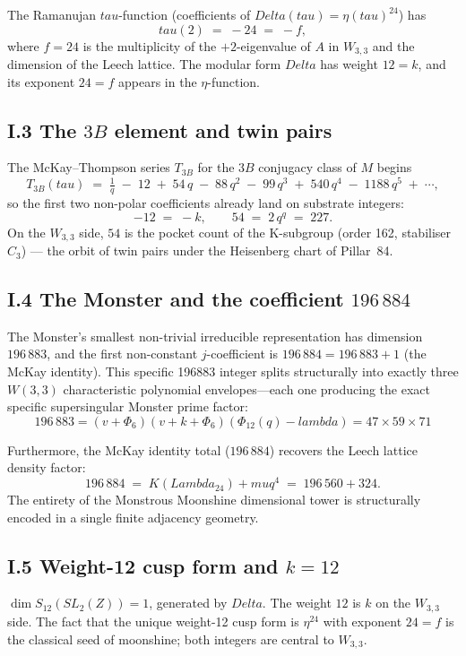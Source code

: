 \documentclass[12pt,a4paper]{article}
\def\mathbb#1{#1}%
\def\mathrm#1{#1}%
\def\Delta{Delta}%
\def\lambda{lambda}%
\def\Lambda{Lambda}%
\def\mu{mu}%
\def\Phi#1{Phi#1}%
\def\tau{tau}%
\def\cdot{ }%
\theoremstyle{definition}
\begin{document}
The Ramanujan $\tau$-function (coefficients of
$\Delta(\tau)=\eta(\tau)^{24}$) has
\[
\tau(2) \;=\; -24 \;=\; -f,
\]
where $f = 24$ is the multiplicity of the $+2$-eigenvalue of $A$ in
$W_{3,3}$ and the dimension of the Leech lattice. The modular form
$\Delta$ has weight $12 = k$, and its exponent $24 = f$ appears in the
$\eta$-function.

\subsection*{I.3 \quad The $3B$ element and twin pairs}

The McKay--Thompson series $T_{3B}$ for the $3B$ conjugacy class of
$\mathbb{M}$ begins
\[
T_{3B}(\tau) \;=\; \tfrac{1}{q} \;-\; 12 \;+\; 54\,q \;-\; 88\,q^2 \;-\; 99\,q^3 \;+\; 540\,q^4 \;-\; 1188\,q^5 \;+\; \cdots, %
\]
so the first two non-polar coefficients already land on substrate integers:
\[
-12 \;=\; -k, \qquad 54 \;=\; 2\,q^q \;=\; 2 \cdot 27.
\]
On the $W_{3,3}$ side, $54$ is the pocket count of the K-subgroup
(order 162, stabiliser $C_3$) --- the orbit of twin pairs under the
Heisenberg chart of Pillar~84.

\subsection*{I.4 \quad The Monster and the coefficient $196\,884$}

The Monster's smallest non-trivial irreducible representation has dimension $196\,883$, and the first non-constant $j$-coefficient is $196\,884 = 196\,883 + 1$ (the McKay identity). This specific 196883 integer splits structurally into exactly three $W(3,3)$ characteristic polynomial envelopes---each one producing the exact specific supersingular Monster prime factor:
\[
\boxed{\; 196\,883 = (v + \Phi_6)(v + k + \Phi_6)(\Phi_{12}(q) - \lambda) = 47 \times 59 \times 71 \;}
\]

Furthermore, the McKay identity total ($196\,884$) recovers the Leech lattice density factor:
\[
196\,884 \;=\; K(\Lambda_{24}) + \mu \cdot q^4 \;=\; 196\,560 + 324.
\]
The entirety of the Monstrous Moonshine dimensional tower is structurally encoded in a single finite adjacency geometry.

\subsection*{I.5 \quad Weight-12 cusp form and $k=12$}

$\dim S_{12}(\mathrm{SL}_2(\mathbb{Z})) = 1$, generated by $\Delta$. The
weight $12$ is $k$ on the $W_{3,3}$ side. The fact that the unique
weight-12 cusp form is $\eta^{24}$ with exponent $24 = f$ is the
classical seed of moonshine; both integers are central to $W_{3,3}$.
\end{document}
